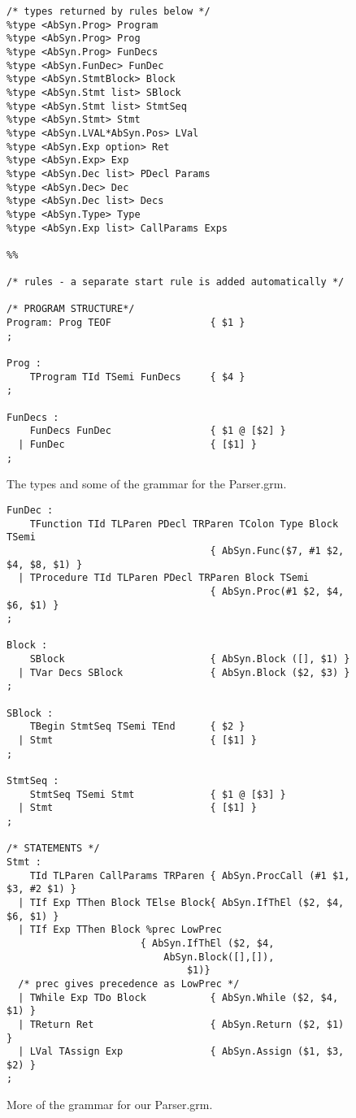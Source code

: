 \documentclass[12pt,a4paper,english]{article}
\begin{document}
\begin{figure}[h]
\begin{lstlisting}
/* types returned by rules below */
%type <AbSyn.Prog> Program
%type <AbSyn.Prog> Prog
%type <AbSyn.Prog> FunDecs
%type <AbSyn.FunDec> FunDec
%type <AbSyn.StmtBlock> Block 
%type <AbSyn.Stmt list> SBlock
%type <AbSyn.Stmt list> StmtSeq
%type <AbSyn.Stmt> Stmt
%type <AbSyn.LVAL*AbSyn.Pos> LVal
%type <AbSyn.Exp option> Ret
%type <AbSyn.Exp> Exp
%type <AbSyn.Dec list> PDecl Params
%type <AbSyn.Dec> Dec
%type <AbSyn.Dec list> Decs
%type <AbSyn.Type> Type
%type <AbSyn.Exp list> CallParams Exps

%%

/* rules - a separate start rule is added automatically */

/* PROGRAM STRUCTURE*/
Program: Prog TEOF                 { $1 } 
;

Prog : 
    TProgram TId TSemi FunDecs     { $4 }
;

FunDecs :
    FunDecs FunDec                 { $1 @ [$2] }
  | FunDec                         { [$1] }
;
\end{lstlisting}
\caption{The types and some of the grammar for the Parser.grm.}\end{figure}

\begin{figure}[h]
\begin{lstlisting}
FunDec :
    TFunction TId TLParen PDecl TRParen TColon Type Block TSemi
                                   { AbSyn.Func($7, #1 $2, $4, $8, $1) }
  | TProcedure TId TLParen PDecl TRParen Block TSemi
                                   { AbSyn.Proc(#1 $2, $4, $6, $1) }
;

Block :
    SBlock                         { AbSyn.Block ([], $1) }
  | TVar Decs SBlock               { AbSyn.Block ($2, $3) }
;

SBlock :
    TBegin StmtSeq TSemi TEnd      { $2 }
  | Stmt                           { [$1] }
;

StmtSeq :
    StmtSeq TSemi Stmt             { $1 @ [$3] }
  | Stmt                           { [$1] }
;

/* STATEMENTS */
Stmt :
    TId TLParen CallParams TRParen { AbSyn.ProcCall (#1 $1, $3, #2 $1) }
  | TIf Exp TThen Block TElse Block{ AbSyn.IfThEl ($2, $4, $6, $1) }
  | TIf Exp TThen Block %prec LowPrec 
			           { AbSyn.IfThEl ($2, $4, 
						   AbSyn.Block([],[]), 
					    	   $1)}
  /* prec gives precedence as LowPrec */
  | TWhile Exp TDo Block           { AbSyn.While ($2, $4, $1) }
  | TReturn Ret                    { AbSyn.Return ($2, $1) }
  | LVal TAssign Exp               { AbSyn.Assign ($1, $3, $2) }
;
\end{lstlisting}
\caption{More of the grammar for our Parser.grm.}\end{figure}
\end{document}
